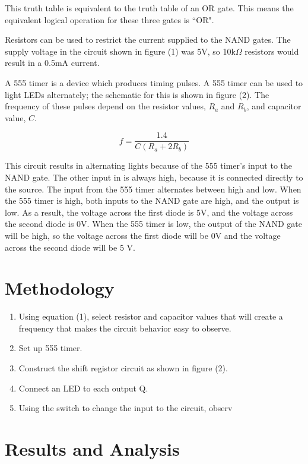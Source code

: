 \documentclass[twocolumn, amsmath]{revtex4}
\begin{document}
This truth table is equivalent to the truth table of an OR gate. This means the equivalent logical operation for these three gates is ``OR".


Resistors can be used to restrict the current supplied to the NAND gates. The supply voltage in the circuit shown in figure (1) was 5V, so 10k$\Omega$ resistors would result in a 0.5mA current.

A 555 timer is a device which produces timing pulses. A 555 timer can be used to light LEDs alternately; the schematic for this is shown in figure (2). The frequency of these pulses depend on the resistor values, $R_a$ and $R_b$, and capacitor value, $C$.

\begin{equation}
f = \frac{1.4}{C(R_a + 2R_b)}
\end{equation}



This circuit results in alternating lights because of the 555 timer's input to the NAND gate. The other input in is always high, because it is connected directly to the source. The input from the 555 timer alternates between high and low. When the 555 timer is high, both inputs to the NAND gate are high, and the output is low. As a result, the voltage across the first diode is 5V, and the voltage across the second diode is 0V. When the 555 timer is low, the output of the NAND gate will be high, so the voltage across the first diode will be 0V and the voltage across the second diode will be 5 V.

\section{Methodology}

\begin{enumerate}
	\item Using equation (1), select resistor and capacitor values that will create a frequency that makes the circuit behavior easy to observe.
	\item Set up 555 timer.
    \item Construct the shift registor circuit as shown in figure (2). 
    \item Connect an LED to each output Q.
    \item Using the switch to change the input to the circuit, observ
\end{enumerate}


\section{Results and Analysis}
\end{document}
